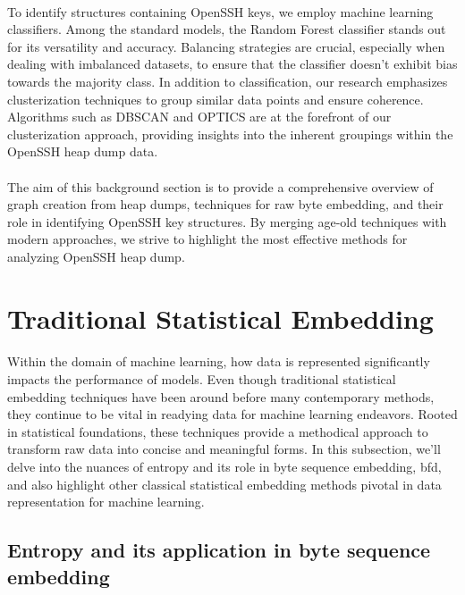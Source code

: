 \paragraph*{}To identify structures containing OpenSSH keys, we employ machine learning classifiers. Among the standard models, the Random Forest classifier stands out for its versatility and accuracy. Balancing strategies are crucial, especially when dealing with imbalanced datasets, to ensure that the classifier doesn't exhibit bias towards the majority class. In addition to classification, our research emphasizes clusterization techniques to group similar data points and ensure coherence. Algorithms such as DBSCAN and OPTICS are at the forefront of our clusterization approach, providing insights into the inherent groupings within the OpenSSH heap dump data.
\paragraph*{}The aim of this background section is to provide a comprehensive overview of graph creation from heap dumps, techniques for raw byte embedding, and their role in identifying OpenSSH key structures. By merging age-old techniques with modern approaches, we strive to highlight the most effective methods for analyzing OpenSSH heap dump.
        
\section{Traditional Statistical Embedding}\label{seq:background:traditional_statistical_embedding}

    \paragraph{}Within the domain of machine learning, how data is represented significantly impacts the performance of models. Even though traditional statistical embedding techniques have been around before many contemporary methods, they continue to be vital in readying data for machine learning endeavors. Rooted in statistical foundations, these techniques provide a methodical approach to transform raw data into concise and meaningful forms. In this subsection, we'll delve into the nuances of entropy and its role in byte sequence embedding, \acrfull{bfd}, and also highlight other classical statistical embedding methods pivotal in data representation for machine learning.
        
    \subsection{Entropy and its application in byte sequence embedding}

